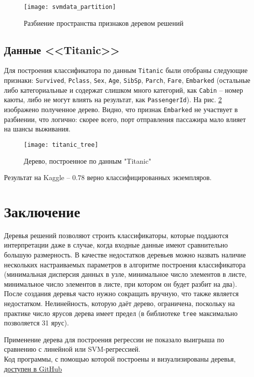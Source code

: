 \documentclass[a4paper,12pt]{article} %
\newcommand{\myPictWidth}{.95\textwidth}
\begin{document}
\begin{figure}[H]
    \centering \texttt{[image: svmdata\_partition]}
    \caption{ Разбиение пространства признаков деревом решений }
    \label{fig:svmdata_partition}
\end{figure}

\newpage
\subsection{Данные <<Titanic>>}

Для построения классификатора по данным \texttt{Titanic} были отобраны следующие признаки:  \texttt{Survived}, \texttt{Pclass}, \texttt{Sex}, \texttt{Age}, \texttt{SibSp}, \texttt{Parch}, \texttt{Fare}, \texttt{Embarked} (остальные либо категориальные и содержат слишком много категорий, как \texttt{Cabin} -- номер каюты, либо не могут влиять на результат, как \texttt{PassengerId}). На рис. \ref{fig:titanic} изображено полученное дерево.
Видно, что признак \texttt{Embarked} не участвует в разбиении, что логично: скорее всего, порт отправления пассажира мало влияет на шансы выживания.

\begin{figure}[H]
    \centering \texttt{[image: titanic\_tree]}
    \caption{ Дерево, построенное по данным "Titanic" }
    \label{fig:titanic}
\end{figure}

Результат на Kaggle -- $ 0.78 $ верно классифицированных экземпляров.

\newpage
\section{Заключение}

Деревья решений позволяют строить классификаторы, которые поддаются интерпретации даже в случае, когда входные данные имеют сравнительно большую размерность.
В качестве недостатков деревьев можно назвать наличие нескольких настраиваемых параметров в алгоритме построения классификатора (минимальная дисперсия данных в узле, минимальное число элементов в листе, минимальное число элементов в листе, при котором он будет разбит на два).
После создания деревья часто нужно сокращать вручную, что также является недостатком.
Нелинейность, которую даёт дерево, ограничена, поскольку на практике число ярусов дерева имеет предел (в библиотеке \texttt{tree} максимально позволяется 31 ярус).

Применение дерева для построения регрессии не показало выигрыша по сравнению с линейной или SVM-регрессией. \\

Код программы, с помощью которой построены и визуализированы деревья, \href{https://github.com/zuevval/source/blob/master/r/ml/tree/tree.R}{доступен в GitHub}
\end{document}
